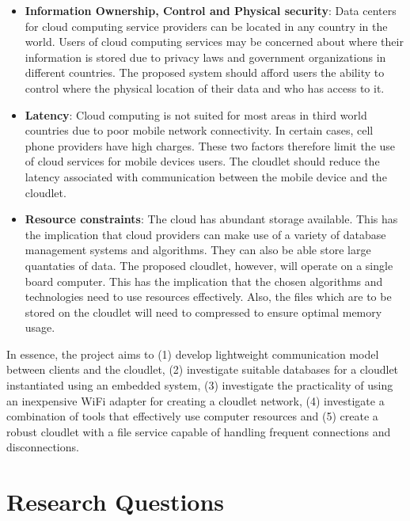   \begin{itemize}
  \itemsep0em
  \item \textbf{Information Ownership, Control and Physical security}: Data centers for cloud computing service providers can be located in any country in the world. Users
  of cloud computing services may be concerned about where their information is stored due to privacy laws and government organizations in different countries. The proposed
  system should afford users the ability to control where the physical location of their data and who has access to it.

   \item \textbf{Latency}: Cloud computing is not suited for most areas in third world countries due to poor mobile network connectivity. In certain cases, cell phone providers
   have high charges. These two factors therefore limit the use of cloud services for mobile devices users. The cloudlet should reduce the latency associated with communication
   between the mobile device and the cloudlet.

  \item \textbf{Resource constraints}: The cloud has abundant storage available. This has the implication that cloud providers can make use of a variety of database management
  systems and algorithms. They can also
  be able store large quantaties of data. The proposed cloudlet, however, will operate on a single board computer. This has the implication that the chosen algorithms and
  technologies need to use resources effectively.
  Also, the files which are to be stored on the cloudlet will need to compressed to ensure optimal memory usage.

 \end{itemize}
 
 In essence, the project aims to (1) develop lightweight communication model
between clients and the cloudlet, (2) investigate suitable databases for a cloudlet instantiated using an embedded system, (3) investigate the practicality of using an inexpensive WiFi adapter for creating a cloudlet network, (4) investigate a combination of tools that effectively use computer resources and (5) create a robust cloudlet with a file service capable of handling frequent connections and disconnections.


\section{Research Questions}

